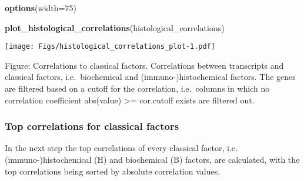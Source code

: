 \documentclass[]{article}
\newenvironment{Shaded}{\begin{snugshade}}{\end{snugshade}}
\newcommand{\KeywordTok}[1]{\textcolor[rgb]{0.13,0.29,0.53}{\textbf{{#1}}}}
\newcommand{\DataTypeTok}[1]{\textcolor[rgb]{0.13,0.29,0.53}{{#1}}}
\newcommand{\DecValTok}[1]{\textcolor[rgb]{0.00,0.00,0.81}{{#1}}}
\newcommand{\NormalTok}[1]{{#1}}
\begin{document}
\begin{Shaded}
\begin{Highlighting}[]
\KeywordTok{options}\NormalTok{(}\DataTypeTok{width=}\DecValTok{75}\NormalTok{)}
\end{Highlighting}
\end{Shaded}

\normalsize

\begin{Shaded}
\begin{Highlighting}[]
\KeywordTok{plot_histological_correlations}\NormalTok{(histological_correlations)}
\end{Highlighting}
\end{Shaded}

\texttt{[image: Figs/histological\_correlations\_plot-1.pdf]}

Figure: Correlations to classical factors. Correlations between
transcripts and classical factors, i.e.~biochemical and
(immuno-)histochemical factors. The genes are filtered based on a cutoff
for the correlation, i.e.~columns in which no correlation coefficient
abs(value) \textgreater{}= cor.cutoff exists are filtered out.

\subsubsection{Top correlations for classical
factors}\label{top-correlations-for-classical-factors}

In the next step the top correlations of every classical factor, i.e.
(immuno-)histochemical (H) and biochemical (B) factors, are calculated,
with the top correlations being sorted by absolute correlation values.
\end{document}
